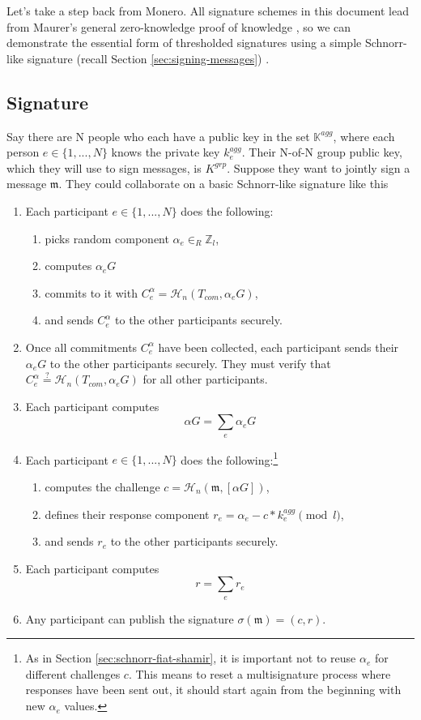 Let's take a step back from Monero. All signature schemes in this document lead from Maurer's general zero-knowledge proof of knowledge \cite{simple-zk-proof-maurer}, so we can demonstrate the essential form of thresholded signatures using a simple Schnorr-like signature (recall Section \ref{sec:signing-messages}) \cite{old-multisig-mrl-note}.


\subsection*{Signature}

Say there are N people who each have a public key in the set $\mathbb{K}^{agg}$, where each person $e \in \{1,...,N\}$ knows the private key $k^{agg}_e$. Their N-of-N group public key, which they will use to sign messages, is $K^{grp}$. Suppose they want to jointly sign a message $\mathfrak{m}$. They could collaborate on a basic Schnorr-like signature like this
\begin{enumerate}
    \item Each participant $e \in \{1,...,N\}$ does the following:
    \begin{enumerate}
        \item picks random component $\alpha_e \in_R \mathbb{Z}_l$,
        \item computes $\alpha_e G$
        \item commits to it with $C^{\alpha}_e = \mathcal{H}_n(T_{com},\alpha_e G)$,
        \item and sends $C^{\alpha}_e$ to the other participants securely.
    \end{enumerate}
    \item Once all commitments $C^{\alpha}_e$ have been collected, each participant sends their $\alpha_e G$ to the other participants securely. They must verify that $C^{\alpha}_e \stackrel{?}{=} \mathcal{H}_n(T_{com},\alpha_e G)$ for all other participants.
    \item Each participant computes 
    \[ \alpha G = \sum_e \alpha_e G \]
    \item Each participant $e \in \{1,...,N\}$ does the following:\footnote{As in Section \ref{sec:schnorr-fiat-shamir}, it is important not to reuse $\alpha_e$ for different challenges $c$. This means to reset a multisignature process where responses have been sent out, it should start again from the beginning with new $\alpha_e$ values.}
    \begin{enumerate}
        \item computes the challenge $c = \mathcal{H}_n(\mathfrak{m},[\alpha G])$,
        \item defines their response component $r_e = \alpha_e - c* k^{agg}_e \pmod l$,
        \item and sends $r_e$ to the other participants securely.
    \end{enumerate}
    \item Each participant computes 
    \[ r = \sum_e r_e\]
    \item Any participant can publish the signature $\sigma(\mathfrak{m}) = (c,r)$.
\end{enumerate}


